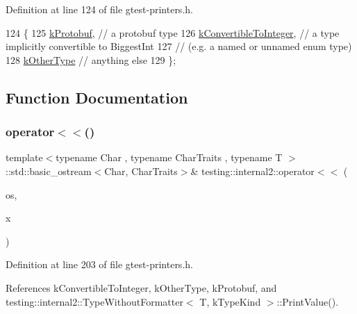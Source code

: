 Definition at line 124 of file gtest-\/printers.\+h.


\begin{DoxyCode}
124               \{
125   \hyperlink{namespacetesting_1_1internal2_aeb8161b0b3ee503347b0662d7028fd57a14aaf98a2547ecf43eef0868d54b1383}{kProtobuf},              \textcolor{comment}{// a protobuf type}
126   \hyperlink{namespacetesting_1_1internal2_aeb8161b0b3ee503347b0662d7028fd57a9bdcf3f1548f498b2b7f097306ea0224}{kConvertibleToInteger},  \textcolor{comment}{// a type implicitly convertible to BiggestInt}
127                           \textcolor{comment}{// (e.g. a named or unnamed enum type)}
128   \hyperlink{namespacetesting_1_1internal2_aeb8161b0b3ee503347b0662d7028fd57abe8aaea44751d6ebd0cdf5bd94451db1}{kOtherType}              \textcolor{comment}{// anything else}
129 \};
\end{DoxyCode}


\subsection{Function Documentation}
\mbox{\label{namespacetesting_1_1internal2_a07dbe129beb8952074f04b599dfce39b}} 
\subsubsection{\texorpdfstring{operator$<$$<$()}{operator<<()}}
{\footnotesize\ttfamily template$<$typename Char , typename Char\+Traits , typename T $>$ \\
\+::std\+::basic\+\_\+ostream$<$Char, Char\+Traits$>$\& testing\+::internal2\+::operator$<$$<$ (\begin{DoxyParamCaption}\item[{\+::std\+::basic\+\_\+ostream$<$ Char, Char\+Traits $>$ \&}]{os,  }\item[{const T \&}]{x }\end{DoxyParamCaption})}



Definition at line 203 of file gtest-\/printers.\+h.



References k\+Convertible\+To\+Integer, k\+Other\+Type, k\+Protobuf, and testing\+::internal2\+::\+Type\+Without\+Formatter$<$ T, k\+Type\+Kind $>$\+::\+Print\+Value().



